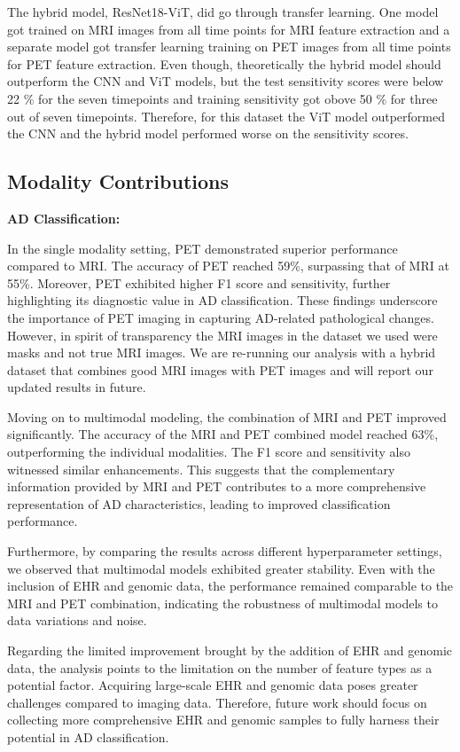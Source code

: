 The hybrid model, ResNet18-ViT, did go through transfer learning. One model got trained on MRI images from all time points for MRI feature extraction and a separate model got transfer learning training on PET images from all time points for PET feature extraction. Even though, theoretically the hybrid model should outperform the CNN and ViT models, but the test sensitivity scores were below 22 \% for the seven timepoints and training sensitivity got obove 50 \% for three out of seven timepoints. Therefore, for this dataset the ViT model outperformed the CNN and the hybrid model performed worse on the sensitivity scores. 

\subsection{Modality Contributions} 

\textbf{AD Classification: }

In the single modality setting, PET demonstrated superior performance compared to MRI. The accuracy of PET reached 59\%, surpassing that of MRI at 55\%. Moreover, PET exhibited higher F1 score and sensitivity, further highlighting its diagnostic value in AD classification. These findings underscore the importance of PET imaging in capturing AD-related pathological changes. However, in spirit of transparency the MRI images in the dataset we used were masks and not true MRI images. We are re-running our analysis with a hybrid dataset that combines good MRI images with PET images and will report our updated results in future.  

Moving on to multimodal modeling, the combination of MRI and PET improved significantly. The accuracy of the MRI and PET combined model reached 63\%, outperforming the individual modalities. The F1 score and sensitivity also witnessed similar enhancements. This suggests that the complementary information provided by MRI and PET contributes to a more comprehensive representation of AD characteristics, leading to improved classification performance. 

Furthermore, by comparing the results across different hyperparameter settings, we observed that multimodal models exhibited greater stability. Even with the inclusion of EHR and genomic data, the performance remained comparable to the MRI and PET combination, indicating the robustness of multimodal models to data variations and noise. 

Regarding the limited improvement brought by the addition of EHR and genomic data, the analysis points to the limitation on the number of feature types  as a potential factor. Acquiring large-scale EHR and genomic data poses greater challenges compared to imaging data. Therefore, future work should focus on collecting more comprehensive EHR and genomic samples to fully harness their potential in AD classification. 

